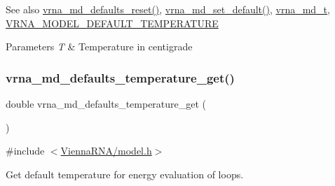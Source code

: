 \begin{DoxySeeAlso}{See also}
\mbox{\hyperlink{group__model__details_ga70834424cf804d149937de89f80ceb45}{vrna\+\_\+md\+\_\+defaults\+\_\+reset()}}, \mbox{\hyperlink{group__model__details_ga8ac6ff84936282436f822644bf841f66}{vrna\+\_\+md\+\_\+set\+\_\+default()}}, \mbox{\hyperlink{group__model__details_ga1f8a10e12a0a1915f2a4eff0b28ea17c}{vrna\+\_\+md\+\_\+t}}, \mbox{\hyperlink{group__model__details_gaf47f9850b3b4763479f7a7e7a15648a2}{V\+R\+N\+A\+\_\+\+M\+O\+D\+E\+L\+\_\+\+D\+E\+F\+A\+U\+L\+T\+\_\+\+T\+E\+M\+P\+E\+R\+A\+T\+U\+RE}} 
\end{DoxySeeAlso}

\begin{DoxyParams}{Parameters}
{\em T} & Temperature in centigrade \\
\hline
\end{DoxyParams}
\mbox{\label{group__model__details_ga96b24a74437f9ba46c4e06343155bf46}} 
\subsubsection{\texorpdfstring{vrna\+\_\+md\+\_\+defaults\+\_\+temperature\+\_\+get()}{vrna\_md\_defaults\_temperature\_get()}}
{\footnotesize\ttfamily double vrna\+\_\+md\+\_\+defaults\+\_\+temperature\+\_\+get (\begin{DoxyParamCaption}\item[{void}]{ }\end{DoxyParamCaption})}



{\ttfamily \#include $<$\mbox{\hyperlink{model_8h}{Vienna\+R\+N\+A/model.\+h}}$>$}



Get default temperature for energy evaluation of loops. 

